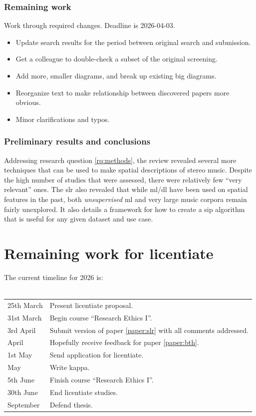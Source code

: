 \documentclass[a4paper]{article}
\begin{document}
\begin{refsection}
\subsubsection*{Remaining work}
Work through required changes. Deadline is 2026-04-03.
\begin{itemize}
    \item Update search results for the period between original search and submission.
    \item Get a colleague to double-check a subset of the original screening.
    \item Add more, smaller diagrams, and break up existing big diagrams.
    \item Reorganize text to make relationship between discovered papers more obvious.
    \item Minor clarifications and typos.
\end{itemize}

\subsubsection*{Preliminary results and conclusions}
Addressing research question \ref{rq:methods}, the review revealed several more techniques that can be used to make spatial descriptions of stereo music. Despite the high number of studies that were assessed, there were relatively few \enquote{very relevant} ones. The \gls{slr} also revealed that while \gls{ml}/\gls{dl} have been used on spatial features in the past, both \textit{unsupervised} \gls{ml} and very large music corpora remain fairly unexplored. It also details a framework for how to create a \gls{sip} algorithm that is useful for any given dataset and use case.

\end{refsection}


\section{Remaining work for licentiate}
The current timeline for 2026 is:
\\\\
\begin{tabular}{ll}
25th March & Present licentiate proposal.\\
31st March & Begin course \enquote{Research Ethics I}.\\
3rd April & Submit version of paper \ref{paper:slr} with all comments addressed.\\
April & Hopefully receive feedback for paper \ref{paper:bth}.\\
1st May & Send application for licentiate.\\
May & Write kappa.\\
5th June & Finish course \enquote{Research Ethics I}.\\
30th June & End licentiate studies.\\
September & Defend thesis.\\
\end{tabular}
\end{document}
